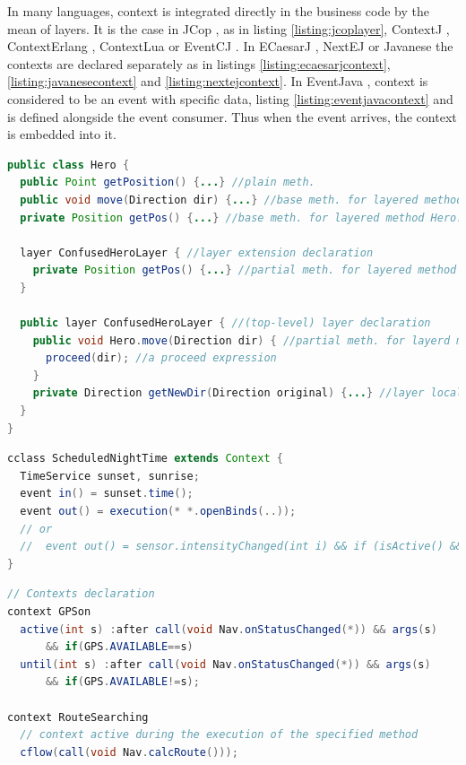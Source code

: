 \documentclass[a4paper]{article}
\begin{document}
In many languages, context is integrated directly in the business code by the mean of layers. It is the case in JCop \cite{appeltauer_declarative_2012}, as in listing \ref{listing:jcoplayer}, ContextJ \cite{appeltauer_dedicated_2008} \cite{appeltauer_improving_2009}, ContextErlang \cite{ghezzi_context_2010}, ContextLua \cite{wasty_contextlua:_2010} or EventCJ \cite{kamina_eventcj:_2011}. In ECaesarJ \cite{nunez_declarative_2009}, NextEJ \cite{kamina_towards_2009} or Javanese \cite{kamina_unified_2013} the contexts are declared separately as in listings \ref{listing:ecaesarjcontext}, \ref{listing:javanesecontext} and \ref{listing:nextejcontext}. In EventJava \cite{jayaram_context-oriented_2009}, context is considered to be an event with specific data, listing \ref{listing:eventjavacontext} and is defined alongside the event consumer. Thus when the event arrives, the context is embedded into it.

\begin{lstlisting}[float, language=Java, caption=JCop layer example, label={listing:jcoplayer}]
public class Hero {
  public Point getPosition() {...} //plain meth.
  public void move(Direction dir) {...} //base meth. for layered method Hero.move
  private Position getPos() {...} //base meth. for layered method Hero.getPos
  
  layer ConfusedHeroLayer { //layer extension declaration
    private Position getPos() {...} //partial meth. for layered method Hero.getPos
  }

  public layer ConfusedHeroLayer { //(top-level) layer declaration
    public void Hero.move(Direction dir) { //partial meth. for layerd meth. Hero.move
      proceed(dir); //a proceed expression
    }
    private Direction getNewDir(Direction original) {...} //layer local method
  }
}
\end{lstlisting}

\begin{lstlisting}[float, language=Java, caption=ECaesarJ context declaration, label={listing:ecaesarjcontext}]
cclass ScheduledNightTime extends Context {
  TimeService sunset, sunrise;
  event in() = sunset.time();
  event out() = execution(* *.openBinds(..));
  // or
  //  event out() = sensor.intensityChanged(int i) && if (isActive() && i > threshold);
}
\end{lstlisting}

\begin{lstlisting}[float, language=Java, caption=Javanese context declaration, label={listing:javanesecontext}]
// Contexts declaration
context GPSon
  active(int s) :after call(void Nav.onStatusChanged(*)) && args(s)
      && if(GPS.AVAILABLE==s)
  until(int s) :after call(void Nav.onStatusChanged(*)) && args(s)
      && if(GPS.AVAILABLE!=s);
      
context RouteSearching
  // context active during the execution of the specified method
  cflow(call(void Nav.calcRoute()));
\end{lstlisting}
\end{document}
